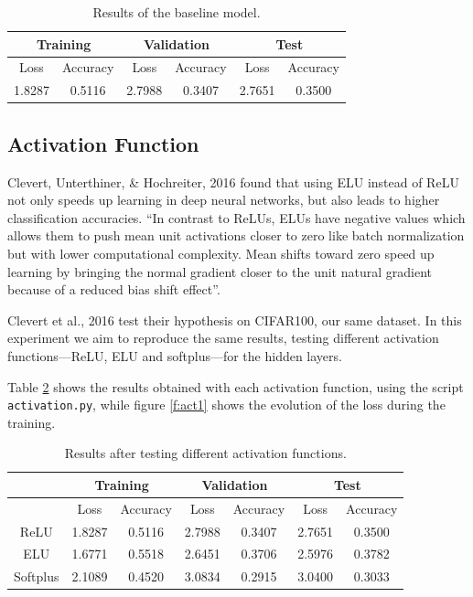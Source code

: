 \documentclass[]{article}
\begin{document}
\begin{table}[H]
	\centering
	\label{t:baseline}
	\begin{tabular}{@{}cccccc@{}}
		\toprule
		\multicolumn{2}{c}{Training} & \multicolumn{2}{c}{Validation} & \multicolumn{2}{c}{Test} \\ \midrule
		Loss         & Accuracy      & Loss          & Accuracy       & Loss       & Accuracy    \\
		\midrule
		1.8287       & 0.5116        & 2.7988        & 0.3407         & 2.7651     & 0.3500      \\ \bottomrule
	\end{tabular}
	\caption{Results of the baseline model.}
\end{table}

\subsection{Activation Function}

Clevert, Unterthiner, \& Hochreiter, 2016 \cite{clevert2015fast} found that using ELU instead of ReLU not only speeds up learning in deep neural networks, but also leads to higher classification accuracies. ``In contrast to ReLUs, ELUs have negative values which allows them to push mean unit activations closer to zero like batch normalization but with lower computational complexity. Mean shifts toward zero speed up learning by bringing the normal gradient closer to the unit natural gradient because of a reduced bias shift effect''.

Clevert et al., 2016 test their hypothesis on CIFAR100, our same dataset. In this experiment we aim to reproduce the same results, testing different activation functions---ReLU, ELU and softplus---for the hidden layers.

Table \ref{t:act} shows the results obtained with each activation function, using the script \texttt{activation.py}, while figure \ref{f:act1} shows the evolution of the loss during the training.

\begin{table}[H]
	\centering
	\label{t:act}
	\begin{tabular}{@{}ccccccc@{}}
		\toprule
		& \multicolumn{2}{c}{Training} & \multicolumn{2}{c}{Validation} & \multicolumn{2}{c}{Test} \\ \midrule
		& Loss         & Accuracy      & Loss          & Accuracy       & Loss       & Accuracy    \\
		\midrule
		ReLU     & 1.8287       & 0.5116        & 2.7988        & 0.3407         & 2.7651     & 0.3500      \\
		ELU      & 1.6771       & 0.5518        & 2.6451        & 0.3706         & 2.5976     & 0.3782      \\
		Softplus & 2.1089       & 0.4520        & 3.0834        & 0.2915         & 3.0400     & 0.3033      \\ \bottomrule
	\end{tabular}
	\caption{Results after testing different activation functions.}
\end{table}
\end{document}
